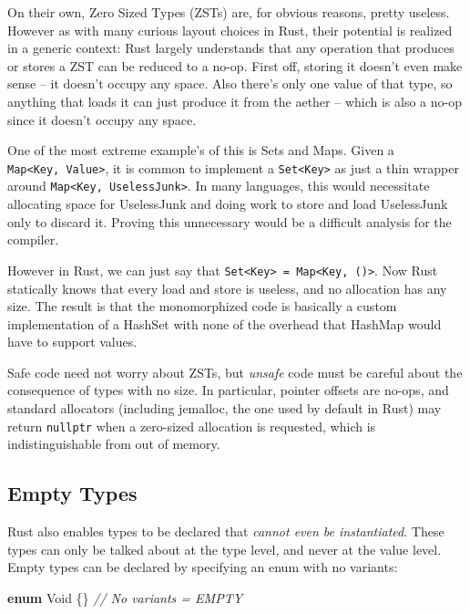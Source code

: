 \documentclass[a4paper,]{book}
\newenvironment{Shaded}{\begin{snugshade}}{\end{snugshade}}
\newcommand{\KeywordTok}[1]{\textcolor[rgb]{0.13,0.29,0.53}{\textbf{{#1}}}}
\newcommand{\CommentTok}[1]{\textcolor[rgb]{0.56,0.35,0.01}{\textit{{#1}}}}
\newcommand{\NormalTok}[1]{{#1}}
\begin{document}
On their own, Zero Sized Types (ZSTs) are, for obvious reasons, pretty
useless. However as with many curious layout choices in Rust, their
potential is realized in a generic context: Rust largely understands
that any operation that produces or stores a ZST can be reduced to a
no-op. First off, storing it doesn't even make sense -- it doesn't
occupy any space. Also there's only one value of that type, so anything
that loads it can just produce it from the aether -- which is also a
no-op since it doesn't occupy any space.

One of the most extreme example's of this is Sets and Maps. Given a
\texttt{Map\textless{}Key,\ Value\textgreater{}}, it is common to
implement a \texttt{Set\textless{}Key\textgreater{}} as just a thin
wrapper around \texttt{Map\textless{}Key,\ UselessJunk\textgreater{}}.
In many languages, this would necessitate allocating space for
UselessJunk and doing work to store and load UselessJunk only to discard
it. Proving this unnecessary would be a difficult analysis for the
compiler.

However in Rust, we can just say that
\texttt{Set\textless{}Key\textgreater{}\ =\ Map\textless{}Key,\ ()\textgreater{}}.
Now Rust statically knows that every load and store is useless, and no
allocation has any size. The result is that the monomorphized code is
basically a custom implementation of a HashSet with none of the overhead
that HashMap would have to support values.

Safe code need not worry about ZSTs, but \emph{unsafe} code must be
careful about the consequence of types with no size. In particular,
pointer offsets are no-ops, and standard allocators (including jemalloc,
the one used by default in Rust) may return \texttt{nullptr} when a
zero-sized allocation is requested, which is indistinguishable from out
of memory.

\subsection{Empty Types}\label{empty-types}

Rust also enables types to be declared that \emph{cannot even be
instantiated}. These types can only be talked about at the type level,
and never at the value level. Empty types can be declared by specifying
an enum with no variants:

\begin{Shaded}
\begin{Highlighting}[]
\KeywordTok{enum} \NormalTok{Void \{\} }\CommentTok{// No variants = EMPTY}
\end{Highlighting}
\end{Shaded}
\end{document}
